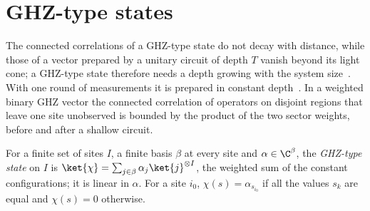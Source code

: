 
\section{GHZ-type states}
\label{sec:ghz}

The connected correlations of a GHZ-type state do not decay with distance, while those of a
vector prepared by a unitary circuit of depth $T$ vanish beyond its light cone; a GHZ-type
state therefore needs a depth growing with the system size~\cite[Example~1]{Piroli2021LOCC}.
With one round of measurements it is prepared in constant
depth~\cite[paragraph ``Long-range MPS using measurements'']{Malz2024Preparation}. In a
weighted binary GHZ vector the connected correlation of operators on disjoint regions that leave
one site unobserved is bounded by the product of the two sector weights, before and after a
shallow circuit.

\begin{definition}
    \label{def:ghz_state}
    \leanok
    For a finite set of sites $I$, a finite basis $\beta$ at every site and $\alpha\in\C^\beta$,
    the \emph{GHZ-type state} on $I$ is
    $\ket{\chi}=\sum_{j\in\beta}\alpha_j\ket{j}^{\otimes I}$, the weighted sum of the constant
    configurations; it is linear in $\alpha$. For a site $i_0$, $\chi(s)=\alpha_{s_{i_0}}$ if
    all the values $s_k$ are equal and $\chi(s)=0$ otherwise.
\end{definition}

